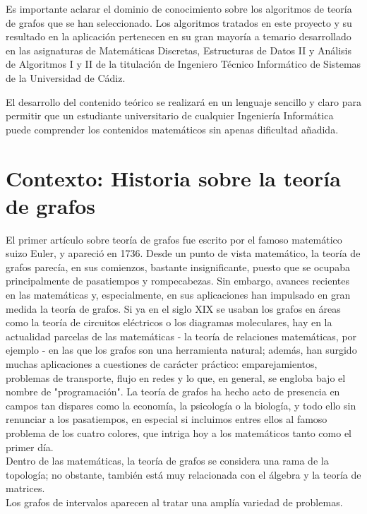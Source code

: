 Es importante aclarar el dominio de conocimiento sobre los algoritmos de teoría de grafos que se han seleccionado. Los algoritmos tratados en este proyecto y su resultado en la aplicación pertenecen en su gran mayoría a temario desarrollado en las asignaturas de Matemáticas Discretas, Estructuras de Datos II y Análisis de Algoritmos I y II de la titulación de Ingeniero Técnico Informático de Sistemas de la Universidad de Cádiz.

El desarrollo del contenido teórico se realizará en un lenguaje sencillo y claro para permitir que un estudiante universitario de cualquier Ingeniería Informática puede comprender los contenidos matemáticos sin apenas dificultad añadida.

\section{Contexto: Historia sobre la teoría de grafos}

El primer artículo sobre teoría de grafos fue escrito por el famoso matemático suizo Euler, y apareció en 1736. Desde un punto de vista matemático, la teoría de grafos parecía, en sus comienzos, bastante insignificante, puesto que se ocupaba principalmente de pasatiempos y rompecabezas. Sin embargo, avances recientes en las matemáticas y, especialmente, en sus aplicaciones han impulsado en gran medida la teoría de grafos. Si ya en el siglo XIX se usaban los grafos en áreas como la teoría de circuitos eléctricos o los diagramas moleculares, hay en la actualidad parcelas de las matemáticas - la teoría de relaciones matemáticas, por ejemplo - en las que los grafos son una herramienta natural; además, han surgido muchas aplicaciones a cuestiones de carácter práctico: emparejamientos, problemas de transporte, flujo en redes y lo que, en general, se engloba bajo el nombre de "programación". La teoría de grafos ha hecho acto de presencia en campos tan dispares como la economía, la psicología o la biología, y todo ello sin renunciar a los pasatiempos, en especial si incluimos entres ellos al famoso problema de los cuatro colores, que intriga hoy a los matemáticos tanto como el primer día.\\

Dentro de las matemáticas, la teoría de grafos se considera una rama de la topología; no obstante, también está muy relacionada con el álgebra y la teoría de matrices.\\

Los grafos de intervalos aparecen al tratar una amplía variedad de problemas. \\

